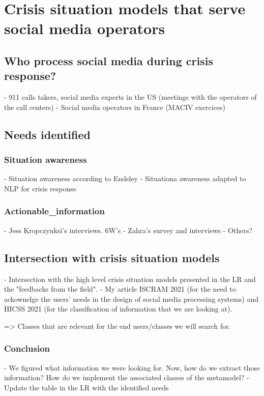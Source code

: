\chapter{Crisis situation models that serve social media operators}

\section{Who process social media during crisis response?}
- 911 calls takers, social media experts in the US (meetings with the operators of the call centers)
- Social media operators in France (MACIV exercices)

\section{Needs identified}
\subsection{Situation awareness}
- Situation awareness according to Endsley
- Situationa awareness adapted to NLP for crisis response

\subsection{Actionable_information}
- Jess Kropczynksi's interviews. 6W's
- Zahra's survey and interviews
- Others?

\section{Intersection with crisis situation models}
- Intersection with the high level crisis situation models presented in the LR and the "feedbacks from the field".
- My article ISCRAM 2021 (for the need to ackownelge the users' needs in the design of social media processing systems) and HICSS 2021 (for the classification of information that we are looking at).

=> Classes that are relevant for the end users/classes we will search for.

\subsection{Conclusion}
- We figured what information we were looking for. Now, how do we extract those information? How do we implement the associated classes of the metamodel?
- Update the table in the LR with the identified needs


